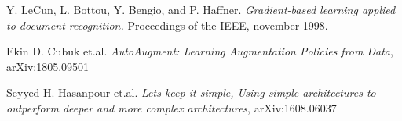 \documentclass[journal]{IEEEtran}
\begin{document}
\begin{thebibliography}{9}
    \raggedright
    Y. LeCun, L. Bottou, Y. Bengio, and P. Haffner. \emph{Gradient-based learning applied to document recognition.} Proceedings of the IEEE, november 1998.

    Ekin D. Cubuk et.al. \emph{AutoAugment: Learning Augmentation Policies from Data}, arXiv:1805.09501
    
    Seyyed H. Hasanpour et.al. \emph{Lets keep it simple, Using simple architectures to outperform deeper and more complex architectures}, arXiv:1608.06037
\end{thebibliography}
\end{document}
